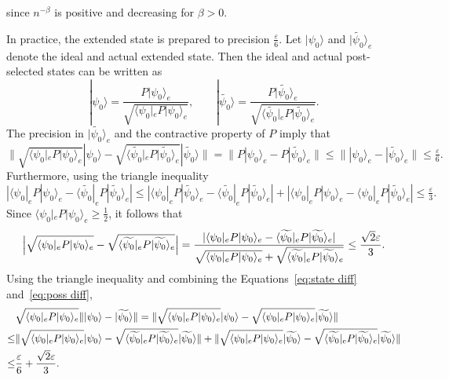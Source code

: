 \documentclass[aps,pra,twocolumn,superscriptaddress,preprintnumbers,amsmath,amssymb]{revtex4-2}
\begin{document}
since $n^{-\beta}$ is positive and decreasing for $\beta>0$. \par
In practice, the extended state is  prepared  to precision $\frac{\varepsilon}{6}$.  Let $|\psi_0\rangle$ and $|\widetilde{\psi_0}\rangle_e$ denote the ideal and actual extended state. Then the ideal and actual  post-selected states can be written as 
  \begin{equation}
      |\psi_0\rangle=\frac{P|\psi_0\rangle_e}{\sqrt{\langle\psi_0|_e P |\psi_0\rangle_e}}, \qquad |\widetilde{\psi_0}\rangle=\frac{P|\widetilde{\psi_0}\rangle_e}{\sqrt{\langle\widetilde{\psi_0}|_e P |\widetilde{\psi_0}\rangle_e}}.
  \end{equation}
  The precision in  $|\widetilde{\psi_0}\rangle_e$ and the contractive property of $P$ imply that
  \begin{equation}\label{eq:state diff}
      \| \sqrt{\langle\psi_0|_e P |\psi_0\rangle_e }|\psi_0\rangle-\sqrt{\langle\widetilde{\psi_0}|_e P |\widetilde{\psi_0}\rangle_e} |\widetilde{\psi_0}\rangle\|=\|P|\psi_0\rangle_e-P|\widetilde{\psi_0}\rangle_e\|\leq \||\psi_0\rangle_e-|\widetilde{\psi_0}\rangle_e\| \leq\tfrac{\varepsilon}{6}.
  \end{equation}
Furthermore, using the triangle inequality
  \begin{equation}
      |\langle\psi_0|_e P |\psi_0\rangle_e -\langle\widetilde{\psi_0}|_e P |\widetilde{\psi_0}\rangle_e|\leq |\langle\psi_0|_e P |\widetilde{\psi_0}\rangle_e -\langle\widetilde{\psi_0}|_e P |\widetilde{\psi_0}\rangle_e|+|\langle\psi_0|_e P |\psi_0\rangle_e -\langle\psi_0|_e P |\widetilde{\psi_0}\rangle_e|\leq \tfrac{\varepsilon}{3}.
  \end{equation}
  Since $\langle\psi_0|_e P |\psi_0\rangle_e\geq \tfrac{1}{2}$, it follows that
  \begin{equation}\label{eq:poss diff}
      \Bigl|\sqrt{\langle\psi_0|_e P |\psi_0\rangle_e}-\sqrt{\langle\widetilde{\psi_0}|_e P |\widetilde{\psi_0}\rangle_e}\Bigr|=\frac{|\langle\psi_0|_e P |\psi_0\rangle_e -\langle\widetilde{\psi_0}|_e P |\widetilde{\psi_0}\rangle_e|}{\sqrt{\langle\psi_0|_e P |\psi_0\rangle_e}+\sqrt{\langle\widetilde{\psi_0}|_e P |\widetilde{\psi_0}\rangle_e}}\leq \frac{\sqrt{2}\varepsilon}{3}.
  \end{equation}
  Using the triangle inequality and combining the Equations~\eqref{eq:state diff} and~\eqref{eq:poss diff},
  \begin{align}
     &\sqrt{\langle\psi_0|_e P |\psi_0\rangle_e}\||\psi_0\rangle-|\widetilde{\psi_0}\rangle\|
     =\| \sqrt{\langle\psi_0|_e P |\psi_0\rangle_e }|\psi_0\rangle-\sqrt{\langle\psi_0|_e P |\psi_0\rangle_e}|\widetilde{\psi_0}\rangle\|\notag\\
     \leq & \| \sqrt{\langle\psi_0|_e P |\psi_0\rangle_e} |\psi_0\rangle-\sqrt{\langle\widetilde{\psi_0}|_e P |\widetilde{\psi_0}\rangle_e} |\widetilde{\psi_0}\rangle\|+\| \sqrt{\langle\psi_0|_e P |\psi_0\rangle_e }|\widetilde{\psi_0}\rangle-\sqrt{\langle\widetilde{\psi_0}|_e P |\widetilde{\psi_0}\rangle_e }|\widetilde{\psi_0}\rangle\|\notag\\
     \leq&\frac{\varepsilon}{6}+\frac{\sqrt{2}\varepsilon}{3}.
  \end{align}
\end{document}
